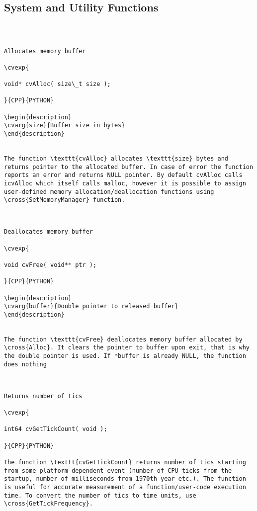 \subsection{System and Utility Functions}
\begin{verbatim}


\end{verbatim}
\begin{verbatim}

Allocates memory buffer

\cvexp{

void* cvAlloc( size\_t size );

}{CPP}{PYTHON}

\begin{description}
\cvarg{size}{Buffer size in bytes}
\end{description}


The function \texttt{cvAlloc} allocates \texttt{size} bytes and returns pointer to the allocated buffer. In case of error the function reports an error and returns NULL pointer. By default cvAlloc calls icvAlloc which itself calls malloc, however it is possible to assign user-defined memory allocation/deallocation functions using \cross{SetMemoryManager} function.


\end{verbatim}
\begin{verbatim}

Deallocates memory buffer

\cvexp{

void cvFree( void** ptr );

}{CPP}{PYTHON}

\begin{description}
\cvarg{buffer}{Double pointer to released buffer}
\end{description}


The function \texttt{cvFree} deallocates memory buffer allocated by \cross{Alloc}. It clears the pointer to buffer upon exit, that is why the double pointer is used. If *buffer is already NULL, the function does nothing


\end{verbatim}
\begin{verbatim}

Returns number of tics

\cvexp{

int64 cvGetTickCount( void );

}{CPP}{PYTHON}

The function \texttt{cvGetTickCount} returns number of tics starting from some platform-dependent event (number of CPU ticks from the startup, number of milliseconds from 1970th year etc.). The function is useful for accurate measurement of a function/user-code execution time. To convert the number of tics to time units, use \cross{GetTickFrequency}.


\end{verbatim}
